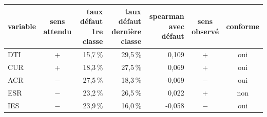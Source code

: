 \begin{tabular}{lcrrrcc}
\toprule
\textbf{variable} & \textbf{sens attendu} & \textbf{taux défaut 1re classe} & \textbf{taux défaut dernière classe} & \textbf{spearman avec défaut} & \textbf{sens observé} & \textbf{conforme} \\
\midrule
DTI & + & 15,7\,\% & 29,5\,\% & 0,109 & + & oui \\
CUR & + & 18,3\,\% & 27,5\,\% & 0,069 & + & oui \\
ACR & $-$ & 27,5\,\% & 18,3\,\% & -0,069 & $-$ & oui \\
ESR & $-$ & 23,2\,\% & 26,5\,\% & 0,022 & + & non \\
IES & $-$ & 23,9\,\% & 16,0\,\% & -0,058 & $-$ & oui \\
\bottomrule
\end{tabular}
